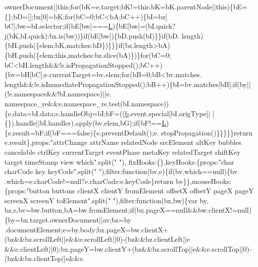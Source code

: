 \begin{DoxyCode}
      ownerDocument||\textcolor{keyword}{this};\textcolor{keywordflow}{for}(bK=e.target;bK!=\textcolor{keyword}{this};bK=bK.parentNode||\textcolor{keyword}{this})\{bE=\{\};bD=[];bx[0]=bK;\textcolor{keywordflow}{for}(bC=0;bC<bA;bC++)\{bI=bz[
      bC];bw=bI.selector;\textcolor{keywordflow}{if}(bE[bw]===\hyperlink{jquery_8js_a38ee4c0b5f4fe2a18d0c783af540d253}{L})\{bE[bw]=(bI.quick?j(bK,bI.quick):bx.is(bw))\}\textcolor{keywordflow}{if}(bE[bw])\{bD.push(bI)\}\}\textcolor{keywordflow}{if}(bD.
      length)\{bH.push(\{elem:bK,matches:bD\})\}\}\}\textcolor{keywordflow}{if}(bz.length>bA)\{bH.push(\{elem:\textcolor{keyword}{this},matches:bz.slice(bA)\})\}\textcolor{keywordflow}{for}(bC=0;
      bC<bH.length&&!e.isPropagationStopped();bC++)\{bv=bH[bC];e.currentTarget=bv.elem;\textcolor{keywordflow}{for}(bB=0;bB<bv.matches.
      length&&!e.isImmediatePropagationStopped();bB++)\{bI=bv.matches[bB];\textcolor{keywordflow}{if}(by||(!e.namespace&&!bI.namespace)||e.
      namespace\_re&&e.namespace\_re.test(bI.namespace))\{e.data=bI.data;e.handleObj=bI;bF=((\hyperlink{jquery_8js_aa4026ad5544b958e54ce5e106fa1c805}{b}.event.special[bI.origType]|
      |\{\}).handle||bI.handler).apply(bv.elem,bG);\textcolor{keywordflow}{if}(bF!==\hyperlink{jquery_8js_a38ee4c0b5f4fe2a18d0c783af540d253}{L})\{e.result=bF;\textcolor{keywordflow}{if}(bF===\textcolor{keyword}{false})\{e.preventDefault();e.
      stopPropagation()\}\}\}\}\}\textcolor{keywordflow}{return} e.result\},props:\textcolor{stringliteral}{"attrChange attrName relatedNode srcElement altKey bubbles
       cancelable ctrlKey currentTarget eventPhase metaKey relatedTarget shiftKey target timeStamp view which"}.split(\textcolor{stringliteral}{" "}),
      fixHooks:\{\},keyHooks:\{props:\textcolor{stringliteral}{"char charCode key keyCode"}.split(\textcolor{stringliteral}{" "}),filter:\textcolor{keyword}{function}(bv,e)\{\textcolor{keywordflow}{if}(bv.which==null)\{bv
      .which=e.charCode!=null?e.charCode:e.keyCode\}\textcolor{keywordflow}{return} bv\}\},mouseHooks:\{props:\textcolor{stringliteral}{"button buttons clientX clientY
       fromElement offsetX offsetY pageX pageY screenX screenY toElement"}.split(\textcolor{stringliteral}{" "}),filter:\textcolor{keyword}{function}(bx,bw)\{var by,
      bz,e,bv=bw.button,bA=bw.fromElement;\textcolor{keywordflow}{if}(bx.pageX==null&&bw.clientX!=null)\{by=bx.target.ownerDocument||av;bz=by
      .documentElement;e=by.body;bx.pageX=bw.clientX+(bz&&bz.scrollLeft||e&&e.scrollLeft||0)-(bz&&bz.clientLeft||e
      &&e.clientLeft||0);bx.pageY=bw.clientY+(bz&&bz.scrollTop||e&&e.scrollTop||0)-(bz&&bz.clientTop||e&&e.

\end{DoxyCode}
